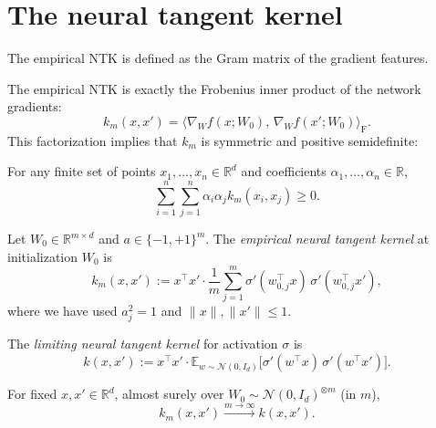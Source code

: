\section{The neural tangent kernel}\label{sec:ntk:kernel}

The empirical NTK is defined as the Gram matrix of the gradient features.

\begin{lemma}\label{lem:ntk:frobInnerGradient}
  \leanok
The empirical NTK is exactly the Frobenius inner product of the network gradients:
\[
  k_m(x, x') = \langle \nabla_W f(x; W_0),\, \nabla_W f(x'; W_0) \rangle_{\mathrm{F}}.
\]
This factorization implies that $k_m$ is symmetric and positive semidefinite:
\end{lemma}

\begin{lemma}\label{lem:ntk:empiricalNTKPSD}
  \leanok
For any finite set of points $x_1, \ldots, x_n \in \mathbb{R}^d$ and coefficients $\alpha_1, \ldots, \alpha_n \in \mathbb{R}$,
\[
  \sum_{i=1}^n \sum_{j=1}^n \alpha_i \alpha_j k_m(x_i, x_j) \ge 0.
\]
\end{lemma}

\begin{definition}\label{def:ntk:shallowEmpiricalNTK}
  \leanok
Let $W_0 \in \mathbb{R}^{m \times d}$ and $a \in \{-1,+1\}^m$.
The \emph{empirical neural tangent kernel} at initialization $W_0$ is
\[
  k_m(x, x') := x^\top x' \cdot \frac{1}{m} \sum_{j=1}^{m}
    \sigma'(w_{0,j}^\top x)\, \sigma'(w_{0,j}^\top x'),
\]
where we have used $a_j^2 = 1$ and $\|x\|, \|x'\| \le 1$.
\end{definition}

\begin{definition}\label{def:ntk:shallowLimitingNTK}
  \leanok
The \emph{limiting neural tangent kernel} for activation $\sigma$ is
\[
  k(x, x') :=
  x^\top x' \cdot \mathbb{E}_{w \sim \mathcal{N}(0, I_d)}
    \!\bigl[\sigma'(w^\top x)\, \sigma'(w^\top x')\bigr].
\]
\end{definition}

\begin{lemma}\label{lem:ntk:ntkConverges}
  \leanok
For fixed $x, x' \in \mathbb{R}^d$, almost surely over
$W_0 \sim \mathcal{N}(0, I_d)^{\otimes m}$ (in $m$),
\[
  k_m(x, x') \xrightarrow{m \to \infty} k(x, x').
\]
\end{lemma}

